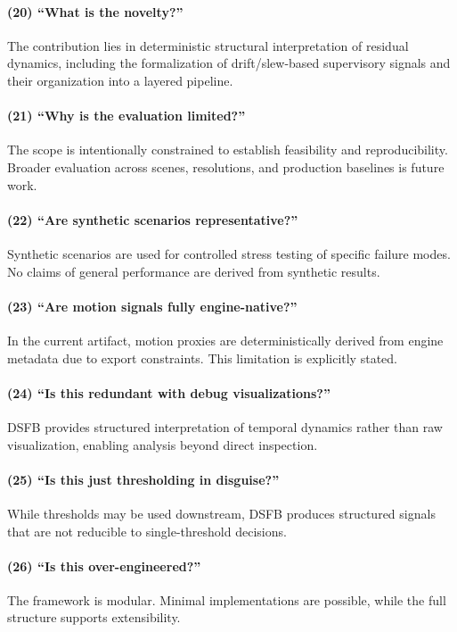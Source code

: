 \documentclass[11pt,letterpaper]{article}
\theoremstyle{gcresult}
\theoremstyle{definition}
\begin{document}
\paragraph{(20) ``What is the novelty?''}
The contribution lies in deterministic structural interpretation of residual dynamics, including the formalization of drift/slew-based supervisory signals and their organization into a layered pipeline.

\paragraph{(21) ``Why is the evaluation limited?''}
The scope is intentionally constrained to establish feasibility and reproducibility. Broader evaluation across scenes, resolutions, and production baselines is future work.

\paragraph{(22) ``Are synthetic scenarios representative?''}
Synthetic scenarios are used for controlled stress testing of specific failure modes. No claims of general performance are derived from synthetic results.

\paragraph{(23) ``Are motion signals fully engine-native?''}
In the current artifact, motion proxies are deterministically derived from engine metadata due to export constraints. This limitation is explicitly stated.

\paragraph{(24) ``Is this redundant with debug visualizations?''}
DSFB provides structured interpretation of temporal dynamics rather than raw visualization, enabling analysis beyond direct inspection.

\paragraph{(25) ``Is this just thresholding in disguise?''}
While thresholds may be used downstream, DSFB produces structured signals that are not reducible to single-threshold decisions.

\paragraph{(26) ``Is this over-engineered?''}
The framework is modular. Minimal implementations are possible, while the full structure supports extensibility.
\end{document}

